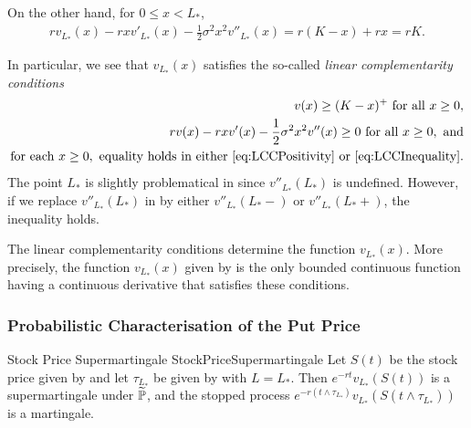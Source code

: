 On the other hand, for $0 \le x < L_*$,
\begin{align} \label{eq:OperatorCheckWaitRegion}
	rv_{L_*}(x) - rxv'_{L_*}(x) - \frac{1}{2}\sigma^2 x^2 v''_{L_*}(x) = r(K - x) + rx = rK.
\end{align}

In particular, we see that $v_{L_*}(x)$ satisfies the so-called \textit{linear complementarity conditions}
\begin{align}
	v(x) \ge (K - x)^+ \text{ for all } x \ge 0, \label{eq:LCCPositivity}                                                 \\
	rv(x) - rxv'(x) - \frac{1}{2}\sigma^2 x^2 v''(x) \ge 0 \text{ for all } x \ge 0, \text{ and} \label{eq:LCCInequality} \\
	\text{for each } x \ge 0, \text{ equality holds in either \Cref{eq:LCCPositivity} or \Cref{eq:LCCInequality}.} \label{eq:LCCSlackness}
\end{align}
The point $L_*$ is slightly problematical in  since $v''_{L_*}(L_*)$ is undefined. However, if we replace $v''_{L_*}(L_*)$ in  by either $v''_{L_*}(L_*-)$ or $v''_{L_*}(L_*+)$, the inequality holds.

The linear complementarity conditions  determine the function $v_{L_*}(x)$. More precisely, the function $v_{L_*}(x)$ given by  is the only bounded continuous function having a continuous derivative that satisfies these conditions.

\subsubsection{Probabilistic Characterisation of the Put Price}

\begin{thm}{Stock Price Supermartingale }{StockPriceSupermartingale}
	Let $S(t)$ be the stock price given by  and let $\tau_{L_*}$ be given by  with $L = L_*$. Then $e^{-rt}v_{L_*}(S(t))$ is a supermartingale under $\widetilde{\mathbb{P}}$, and the stopped process $e^{-r(t \land \tau_{L_*})}v_{L_*}(S(t \land \tau_{L_*}))$ is a martingale.
\end{thm}

